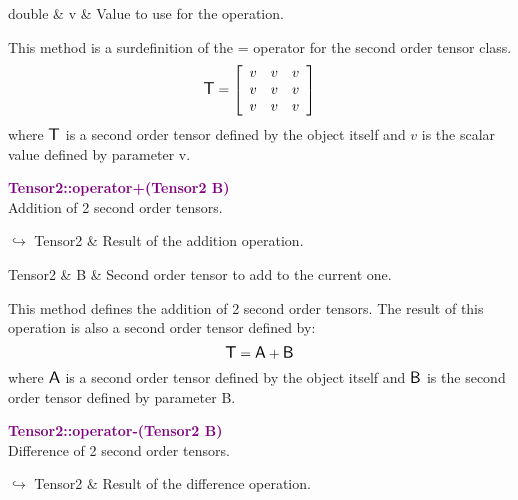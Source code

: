 \begin{tcolorbox}[width=\textwidth,myArgs,tabularx={ll|R}]
double & v & Value to use for the operation.
\end{tcolorbox}

This method is a surdefinition of the = operator for the second order tensor class.
\begin{equation*}
\mbox{\large\ensuremath{\mathsf{T}}}=\left[\begin{array}{ccc}
v & v & v\\
v & v & v\\
v & v & v
\end{array}\right]
\end{equation*}
where $\mbox{\large\ensuremath{\mathsf{T}}}$ is a second order tensor defined by the object itself and $v$ is the scalar value defined by parameter v.

\textcolor{purple}{\textbf{Tensor2::operator+(Tensor2 B)}}\label{Tensor2::operator+(Tensor2 B)}\\
Addition of 2 second order tensors.\vspace*{-0.5em}
\begin{tcolorbox}[grow to left by=-1cm, width=\textwidth-1cm,myArgs,tabularx={l|R}]
$\hookrightarrow$ Tensor2 & Result of the addition operation.
\end{tcolorbox}

\begin{tcolorbox}[width=\textwidth,myArgs,tabularx={ll|R}]
Tensor2 & B & Second order tensor to add to the current one.
\end{tcolorbox}

This method defines the addition of 2 second order tensors.
The result of this operation is also a second order tensor defined by:
\begin{equation*}
\mbox{\large\ensuremath{\mathsf{T}}} = \mbox{\large\ensuremath{\mathsf{A}}} + \mbox{\large\ensuremath{\mathsf{B}}}
\end{equation*}
where $\mbox{\large\ensuremath{\mathsf{A}}}$ is a second order tensor defined by the object itself and $\mbox{\large\ensuremath{\mathsf{B}}}$ is the second order tensor defined by parameter B.

\textcolor{purple}{\textbf{Tensor2::operator-(Tensor2 B)}}\label{Tensor2::operator-(Tensor2 B)}\\
Difference of 2 second order tensors.\vspace*{-0.5em}
\begin{tcolorbox}[grow to left by=-1cm, width=\textwidth-1cm,myArgs,tabularx={l|R}]
$\hookrightarrow$ Tensor2 & Result of the difference operation.
\end{tcolorbox}

